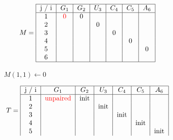 \begin{figure}[H]
    \centering
    \begin{subfigure}[t]{0.25\textwidth}
        \scriptsize \[
                        M =  \begin{tabular}{|c|c|c|c|c|c|c|}
                                 \hline
                                 j / i & $G_1$              & $G_2$ & $U_3$ & $C_4$ & $C_5$ & $A_6$ \\ \hline
                                 1     & \textcolor{red}{0} & 0     &       &       &       &       \\
                                 2     &                    &       & 0     &       &       &       \\
                                 3     &                    &       &       & 0     &       &       \\
                                 4     &                    &       &       &       & 0     &       \\
                                 5     &                    &       &       &       &       & 0     \\
                                 6     &                    &       &       &       &       &       \\ \hline
                        \end{tabular}
        \]
        \caption{$M(1,1) \gets 0$}
    \end{subfigure}
    \hfill
    \begin{subfigure}[t]{0.65\textwidth}
        \scriptsize \[
                        T =     \begin{tabular}{|c|c|c|c|c|c|c|}
                                    \hline
                                    j / i & $G_1$                     & $G_2$ & $U_3$ & $C_4$ & $C_5$ & $A_6$ \\ \hline
                                    1     & \textcolor{red}{unpaired} & init  &       &       &       &       \\
                                    2     &                           &       & init  &       &       &       \\
                                    3     &                           &       &       & init  &       &       \\
                                    4     &                           &       &       &       & init  &       \\
                                    5     &                           &       &       &       &       & init  \\

\end{tabular}\]
\end{subfigure}
\end{figure}
